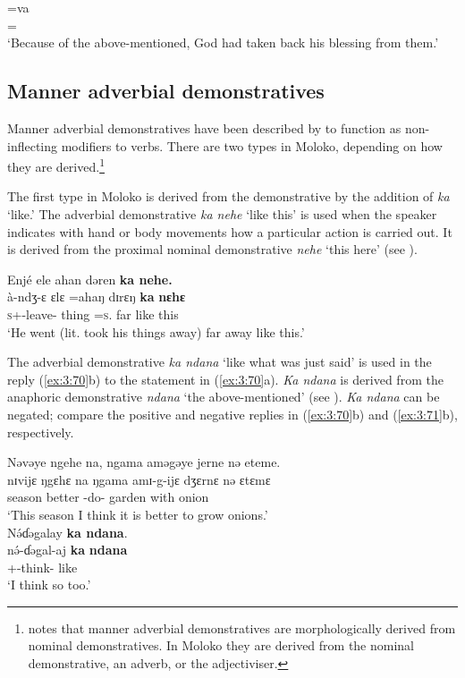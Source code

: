       \medskip
\largerpage     
\gll =va\\
     ={\PRF}\\
\glt  ‘Because of the above-mentioned, God had taken back his blessing from them.’
\z

\subsection{Manner adverbial demonstratives}\label{sec:3.2.3}
\hypertarget{RefHeading1211001525720847}{}
Manner adverbial demonstratives have been described by \citet{Dixon2003} to function as non-inflecting modifiers to verbs. There are two types in Moloko, depending on how they are derived.\footnote{\citet{Dixon2003} notes that manner adverbial demonstratives are morphologically derived from nominal demonstratives. In Moloko they are derived from the nominal demonstrative, an adverb, or the adjectiviser.} 

The first type in Moloko is derived from the demonstrative by the addition of \textit{ka} ‘like.’ The adverbial demonstrative \textit{ka nehe} ‘like this’  is used when the speaker indicates with hand or body movements how a particular action is carried out. It is derived from the proximal nominal demonstrative \textit{nehe} ‘this here’ (see ).

\ea \label{ex:3:69}
Enjé  ele  ahan  dəren  \textbf{ka  nehe.}\\
\gll  à-ndʒ-ɛ  ɛlɛ  =ahaŋ    dɪrɛŋ  \textbf{ka}  \textbf{nɛhɛ}\\
      \textsc{s}+{\PFV}-leave-{\CL}  thing  =\textsc{s}.{\POSS}  far  like   this\\
\glt  ‘He went (lit. took his things away) far away like this.’  
\z

The adverbial demonstrative \textit{ka ndana} ‘like what was just said’ is used  in the reply (\ref{ex:3:70}b) to the statement in (\ref{ex:3:70}a). \textit{Ka ndana} is derived from the anaphoric demonstrative \textit{ndana} ‘the above-mentioned’ (see ). \textit{Ka ndana} can be negated; compare the positive and negative replies in (\ref{ex:3:70}b) and (\ref{ex:3:71}b), respectively.

\ea \label{ex:3:70}
\ea Nəvəye  ngehe  na,  ngama  aməgəye  jerne  nə  eteme. \\
\gll  nɪvijɛ  ŋgɛhɛ    na    ŋgama   amɪ-g-ijɛ  dʒɛrnɛ   nə    ɛtɛmɛ  \\
      season  {\DEM}   {\PSP}    better    {\DEP}-do-{\CL}        garden  with      onion  \\
\glt  ‘This season I think it is better to grow onions.’ \\
\ex
N\'{ə}ɗəgalay  \textbf{ka  ndana}.\\
\gll n\'{ə}-ɗəgal-aj  \textbf{ka}  \textbf{ndana}\\
     {\oneS}+{\IFV}-think-{\CL}  like  {\DEM}\\
\glt ‘I think so too.’\\     
\z\z

